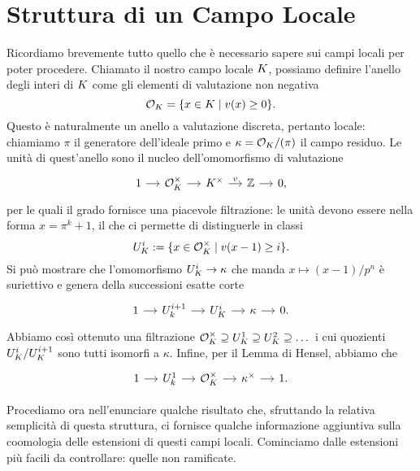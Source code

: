 \section{Struttura di un Campo Locale}
Ricordiamo brevemente tutto quello che è necessario sapere sui campi locali per poter procedere. Chiamato il nostro campo locale $ K $, possiamo definire l'anello degli interi di $ K $ come gli elementi di valutazione non negativa
\[ \mathcal{O}_{K} = \{ x \in K \mid v(x)\geq 0 \}. \]
Questo è naturalmente un anello a valutazione discreta, pertanto locale: chiamiamo $ \pi $ il generatore dell'ideale primo e $ \kappa = \mathcal{O}_{K}/(\pi) $ il campo residuo. Le unità di quest'anello sono il nucleo dell'omomorfismo di valutazione
\begin{equation}\label{local1}
	\begin{tikzcd}[column sep = small]
	1 \rar
	& \mathcal{O}_{\K}^\times \rar
	& \K^\times \rar["v"]
	& \Z \rar
	& 0,
	\end{tikzcd}
\end{equation}
per le quali il grado fornisce una piacevole filtrazione: le unità devono essere nella forma $ x = \pi^k +1 $, il che ci permette di distinguerle in classi  $$  U_{K}^i :=\{x \in \mathcal{O}_{K}^\times \mid v(x-1) \geq i \}.  $$ Si può mostrare che l'omomorfismo $ U_{K}^i \to \kappa $ che manda $ x \mapsto (x-1)/p^n $ è suriettivo e genera della successioni esatte corte
\begin{equation}\label{local2}
\begin{tikzcd}[column sep = small]
1 \rar
& U_k^{i+1} \rar
& U_{\K}^i \rar
& \kappa \rar
& 0.
\end{tikzcd}
\end{equation}
Abbiamo così ottenuto una filtrazione $ \mathcal{O}_{K}^\times \supseteq U_{K}^1 \supseteq U_{K}^2 \supseteq \dots $ 
i cui quozienti $ U_{K}^i / U_{K}^{i+1} $ sono tutti isomorfi a $ \kappa $.
Infine, per il Lemma di Hensel, abbiamo che
\begin{equation}\label{local3}
	\begin{tikzcd}[column sep = small]
	1 \rar
	& U_k^{1} \rar
	& \mathcal{O}_{\K}^\times \rar
	& \kappa^\times \rar
	&1.
	\end{tikzcd}
\end{equation}


Procediamo ora nell'enunciare qualche risultato che, sfruttando la relativa semplicità di questa struttura, ci fornisce qualche informazione aggiuntiva sulla coomologia delle estensioni di questi campi locali. Cominciamo dalle estensioni più facili da controllare: quelle non ramificate.

